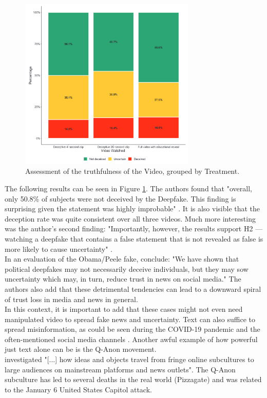 \documentclass[
  a4paper,  %
  twoside,  %
  bibliography=totoc,
  headsepline,
  cleardoublepage=empty,
  parskip=half,
  draft=false
]{scrbook}
\begin{document}
\begin{figure}[h]
  \centering
  \includegraphics[width=0.75\textwidth]{./graphics/obamafake.png}
  \caption{Assessment of the truthfulness of the Video, grouped by Treatment. \cite{vaccariDeepfakesDisinformationExploring2020}}
  \label{fig:obamafake-eval}
\end{figure}

The following results can be seen in Figure \ref{fig:obamafake-eval}. The authors found that "overall, only 50.8\% of subjects were not deceived by the Deepfake. This finding is surprising given the statement was highly improbable" \cite{vaccariDeepfakesDisinformationExploring2020}. 
It is also visible that the deception rate was quite consistent over all three videos. Much more interesting was the author's second finding: "Importantly, however, the results support H2 — watching a deepfake that contains a false statement that is not revealed as false is more likely to cause uncertainty" \cite{vaccariDeepfakesDisinformationExploring2020}. \\
In an evaluation of the Obama/Peele fake, \citet{vaccariDeepfakesDisinformationExploring2020} conclude: "We have shown that political deepfakes may not necessarily deceive individuals, but they may sow uncertainty which may, in turn, reduce trust in news on social media." The authors also add that these detrimental tendencies can lead to a downward spiral of trust loss in media and news in general. \\
In this context, it is important to add that these cases might not even need manipulated video to spread fake news and uncertainty. Text can also suffice to spread misinformation, as could be seen during the COVID-19 pandemic and the often-mentioned social media channels \cite{naeemExplorationHowFake2021}. Another awful example of how powerful just text alone can be is the Q-Anon movement. \\
\citet{zeeuwTracingNormieficationCrossplatform2020} investigated "[...] how ideas and objects travel from fringe online subcultures to large audiences on mainstream platforms and news outlets". The Q-Anon subculture has led to several deaths in the real world (Pizzagate) and was related to the January 6 United States Capitol attack.
\end{document}
